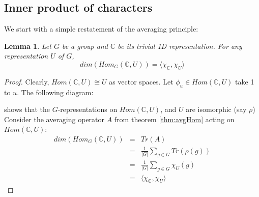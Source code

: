 \documentclass{sig-alternate}
\newtheorem{lemma}[theorem]{Lemma}
\begin{document}
\subsection{Inner product of characters}
We start with a simple restatement of the averaging principle:
\begin{lemma}
Let $G$ be a group and $\mathbb{C}$ be its trivial 1D representation. For any representation $U$ of $G$,
\[ dim(Hom_G(\mathbb{C}, U)) =  \langle\chi_{\mathbb{C}}, \chi_U\rangle \]
\end{lemma}
\begin{proof}
Clearly, $Hom(\mathbb{C}, U) \cong U$ as vector spaces. Let $\phi_u \in Hom(\mathbb{C}, U)$ take 1 to $u$. The following diagram:
\begin{center}
\end{center}
\noindent shows that the $G$-representations on $Hom(\mathbb{C}, U)$, and $U$ are isomorphic (say $\rho$)\\

\noindent Consider the averaging operator $A$ from theorem \ref{thm:avgHom} acting on $Hom(\mathbb{C}, U)$:
\begin{eqnarray*}
dim(Hom_G(\mathbb{C}, U)) & = & Tr(A) \\
& = & \frac{1}{|G|}\sum_{g\in G}Tr(\rho(g)) \\
& = &  \frac{1}{|G|}\sum_{g\in G}\chi_U(g) \\
& = & \langle\chi_{\mathbb{C}}, \chi_U\rangle
\end{eqnarray*}
\end{proof}
\end{document}

